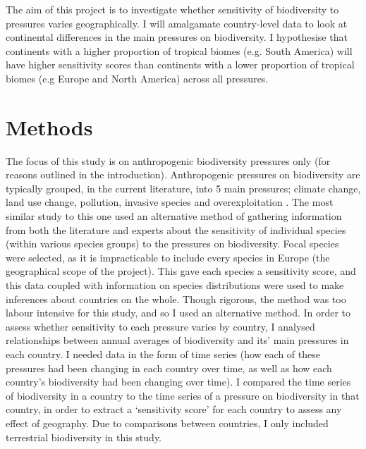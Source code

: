 \documentclass[11pt, a4paper, titlepage]{article}
\begin{document}
 	The aim of this project is to investigate whether sensitivity of biodiversity to pressures varies geographically. I will amalgamate country-level data to look at continental differences in the main pressures on biodiversity. I hypothesise that continents with a higher proportion of tropical biomes (e.g. South America) will have higher sensitivity scores than continents with a lower proportion of tropical biomes (e.g Europe and North America) across all pressures.  \newpage

    \section*{Methods}

	The focus of this study is on anthropogenic biodiversity pressures only (for reasons outlined in the introduction). Anthropogenic pressures on biodiversity are typically grouped, in the current literature, into 5 main pressures; climate change, land use change, pollution, invasive species and overexploitation \citep{watson2019summary}. The most similar study to this one \citep{louette2010bioscore} used an alternative method of gathering information from both the literature and experts about the sensitivity of individual species (within various species groups) to the pressures on biodiversity. Focal species were selected, as it is impracticable to include every species in Europe (the geographical scope of the project). 
	This gave each species a sensitivity score, and this data coupled with information on species distributions were used to make inferences about countries on the whole. Though rigorous, the \cite{louette2010bioscore} method was too labour intensive for this study, and so I used an alternative method. In order to assess whether sensitivity to each pressure varies by country, I analysed relationships between annual averages of biodiversity and its' main pressures in each country. I needed data in the form of time series (how each of these pressures had been changing in each country over time, as well as how each country's biodiversity had been changing over time). I compared the time series of biodiversity in a country to the time series of a pressure on biodiversity in that country, in order to extract a `sensitivity score' for each country to assess any effect of geography. Due to comparisons between countries, I only included terrestrial biodiversity in this study. 	 %
	
\end{document}
